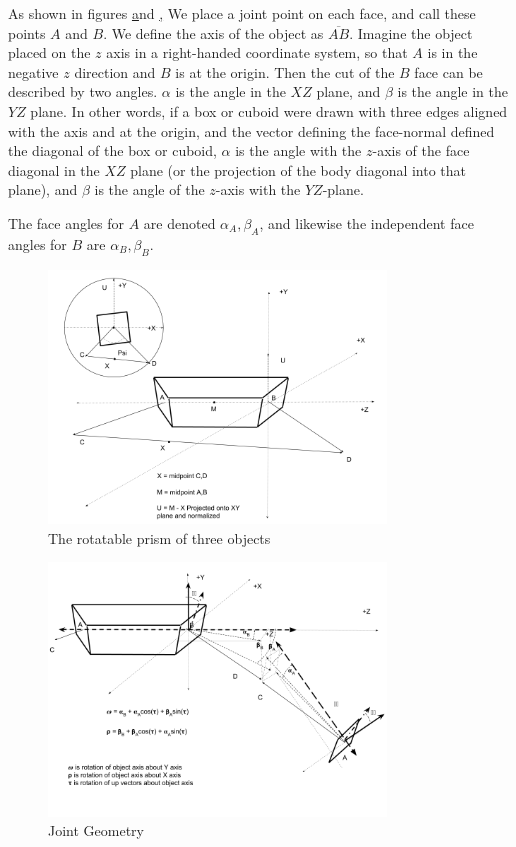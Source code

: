 \documentclass[11pt]{article}
\begin{document}
As shown in figures \href{fig:intrinsicdiagram} and \href{fig:jointdiagram},
We place a joint point on each face, and call these points $A$ and $B$.
We define the axis of the object as $\overline{AB}$. Imagine the
object placed on the $z$ axis in a right-handed coordinate system, so that
$A$ is in the negative $z$ direction and $B$ is at the origin. Then
the cut of the $B$ face can be described by two angles. $\alpha$ is the
angle in the $XZ$ plane, and $\beta$ is the angle in the $YZ$ plane.
In other words, if a box or cuboid were drawn with three edges aligned
with the axis and at the origin, and the vector defining the face-normal
defined the diagonal of the box or cuboid, $\alpha$ is the angle with the $z$-axis
of the
face diagonal in the $XZ$ plane (or the projection of the body diagonal
into that plane), and $\beta$ is the angle of the $z$-axis with the $YZ$-plane.

The face angles for $A$ are denoted $\alpha_A, \beta_A$, and likewise
the independent face angles for $B$ are $\alpha_B, \beta_B$.


\begin{figure}
     \centering
     \includegraphics[width=0.80\textwidth]{figures/ObjectForStackingSetup.png}
     \caption{The rotatable prism of three objects}
  \label{fig:intrinsicdiagram}
\end{figure}

\begin{figure}
     \centering
     \includegraphics[width=0.80\textwidth]{figures/JointGeometry.png}
     \caption{Joint Geometry}
  \label{fig:jointdiagram}
\end{figure}
\end{document}
